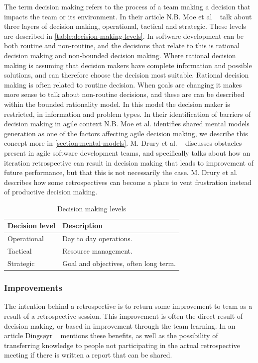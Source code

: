 The term decision making refers to the process of a team making a decision that impacts the team or its environment. In their article N.B. Moe et al ~\cite{Moe2011} talk about three layers of decision making, operational, tactical and strategic. These levels are described in \autoref{table:decision-making-levels}. In software development can be both routine and non-routine, and the decisions that relate to this is rational decision making and non-bounded decision making. Where rational decision making is assuming that decision makers have complete information and possible solutions, and can therefore choose the decision most suitable. Rational decision making is often related to routine decision. When goals are changing it makes more sense to talk about non-routine decisions, and these are can be described within the bounded rationality model. In this model the decision maker is restricted, in information and problem types. In their identification of barriers of decision making in agile context N.B. Moe et al. identifies shared mental models generation as one of the factors affecting agile decision making, we describe this concept more in \autoref{section:mental-models}. M. Drury et al. ~\cite{Drury2012} discusses obstacles present in agile software development teams, and specifically talks about how an iteration retrospective can result in decision making that leads to improvement of future performance, but that this is not necessarily the case. M. Drury et al. describes how some retrospectives can become a place to vent frustration instead of productive decision making.



\begin{table}[h]
	\begin{center}
		\caption{Decision making levels}
		\label{table:decision-making-levels}
		\begin{tabular}{l l}
			\hline
			Decision level & Description \\
			\hline
			Operational & Day to day operations. \\
			Tactical & Resource management.\\
			Strategic & Goal and objectives, often long term. \\
			\hline
		\end{tabular}
	\end{center}
\end{table}



\subsubsection{Improvements}
The intention behind a retrospective is to return some improvement to team as a result of a retrospective session. This improvement is often the direct result of decision making, or based in improvement through the team learning. In an article Dingsøyr ~\cite{Dingsoyr2004} mentions these benefits, as well as the possibility of transferring knowledge to people not participating in the actual retrospective meeting if there is written a report that can be shared. 


